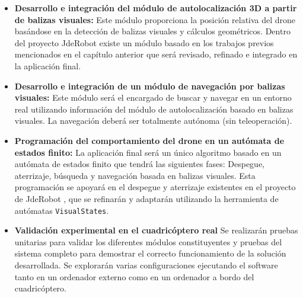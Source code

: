 \begin{itemize}
	
	\item \textbf{Desarrollo e integración del módulo de autolocalización 3D a partir de balizas visuales:} Este módulo proporciona la posición relativa del drone basándose en la detección de balizas visuales y cálculos geométricos. Dentro del proyecto JdeRobot existe un módulo basado en los trabajos previos mencionados en el capítulo anterior \cite{AlbertoLopez} \cite{ManuelZafra} \cite{JesusSaiz} que será revisado, refinado e integrado en la aplicación final.
	
	\item \textbf{Desarrollo e integración de un módulo de navegación por balizas visuales:} Este módulo será el encargado de buscar y navegar en un entorno real utilizando información del módulo de autolocalización basado en balizas visuales. La navegación deberá ser totalmente autónoma (sin teleoperación).
	
	
	
	\item \textbf{Programación del comportamiento del drone  en un autómata de estados finito:} La aplicación final será un único algoritmo basado en un autómata de estados finito que tendrá las siguientes fases: Despegue, aterrizaje, búsqueda y navegación basada en balizas visuales. Esta programación se apoyará en el despegue y aterrizaje existentes en el proyecto de JdeRobot \cite{JorgeVela} \cite{JesusSaiz}, que se refinarán y adaptarán utilizando la herramienta de autómatas \texttt{VisualStates}.
	
	\item \textbf{Validación experimental en el cuadricóptero  real} Se realizarán pruebas unitarias para validar los diferentes módulos constituyentes y pruebas del sistema completo para demostrar el correcto funcionamiento de la solución desarrollada. Se explorarán varias configuraciones ejecutando el software tanto en un ordenador externo como en un ordenador a bordo del cuadricóptero.
	
\end{itemize}

